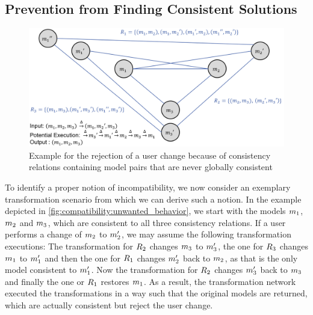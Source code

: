 \subsection{Prevention from Finding Consistent Solutions}

\begin{figure}
    \centering
    \includegraphics[width=\textwidth]{figures/correctness/compatibility/unwanted_behavior.png}
    \caption[Example for the unwanted rejection of a user change]{Example for the rejection of a user change because of consistency relations containing model pairs that are never globally consistent}
    \label{fig:compatibility:unwanted_behavior}
\end{figure}

To identify a proper notion of incompatibility, we now consider an exemplary transformation scenario from which we can derive such a notion.
In the example depicted in \autoref{fig:compatibility:unwanted_behavior}, we start with the models $m_{1}$, $m_{2}$ and $m_{3}$, which are consistent to all three consistency relations.
If a user performs a change of $m_{2}$ to $m_{2}'$, we may assume the following transformation executions:
The transformation for $R_{2}$ changes $m_{3}$ to $m_{3}'$, the one for $R_{3}$ changes $m_{1}$ to $m_{1}'$ and then the one for $R_{1}$ changes $m_{2}'$ back to $m_{2}$, as that is the only model consistent to $m_{1}'$.
Now the transformation for $R_{2}$ changes $m_{3}'$ back to $m_{3}$ and finally the one or $R_{1}$ restores $m_{1}$.
As a result, the transformation network executed the transformations in a way such that the original models are returned, which are actually consistent but reject the user change.

